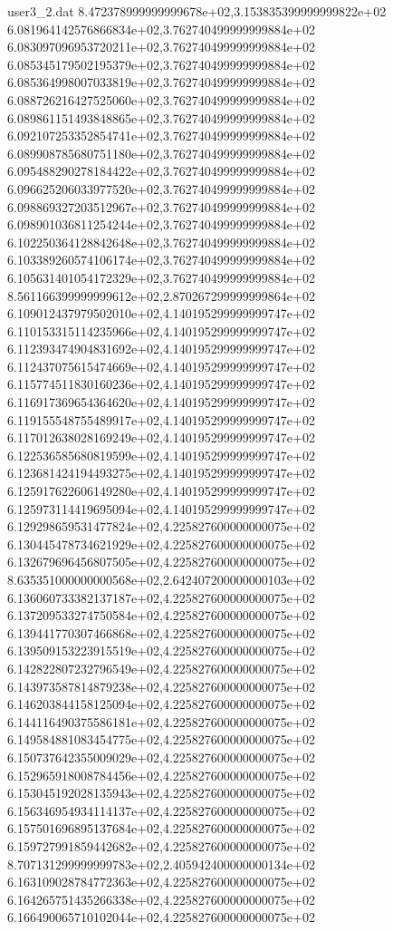 \begin{filecontents}{user3_2.dat}
8.472378999999999678e+02,3.153835399999999822e+02
6.081964142576866834e+02,3.762740499999999884e+02
6.083097096953720211e+02,3.762740499999999884e+02
6.085345179502195379e+02,3.762740499999999884e+02
6.085364998007033819e+02,3.762740499999999884e+02
6.088726216427525060e+02,3.762740499999999884e+02
6.089861151493848865e+02,3.762740499999999884e+02
6.092107253352854741e+02,3.762740499999999884e+02
6.089908785680751180e+02,3.762740499999999884e+02
6.095488290278184422e+02,3.762740499999999884e+02
6.096625206033977520e+02,3.762740499999999884e+02
6.098869327203512967e+02,3.762740499999999884e+02
6.098901036811254244e+02,3.762740499999999884e+02
6.102250364128842648e+02,3.762740499999999884e+02
6.103389260574106174e+02,3.762740499999999884e+02
6.105631401054172329e+02,3.762740499999999884e+02
8.561166399999999612e+02,2.870267299999999864e+02
6.109012437979502010e+02,4.140195299999999747e+02
6.110153315114235966e+02,4.140195299999999747e+02
6.112393474904831692e+02,4.140195299999999747e+02
6.112437075615474669e+02,4.140195299999999747e+02
6.115774511830160236e+02,4.140195299999999747e+02
6.116917369654364620e+02,4.140195299999999747e+02
6.119155548755489917e+02,4.140195299999999747e+02
6.117012638028169249e+02,4.140195299999999747e+02
6.122536585680819599e+02,4.140195299999999747e+02
6.123681424194493275e+02,4.140195299999999747e+02
6.125917622606149280e+02,4.140195299999999747e+02
6.125973114419695094e+02,4.140195299999999747e+02
6.129298659531477824e+02,4.225827600000000075e+02
6.130445478734621929e+02,4.225827600000000075e+02
6.132679696456807505e+02,4.225827600000000075e+02
8.635351000000000568e+02,2.642407200000000103e+02
6.136060733382137187e+02,4.225827600000000075e+02
6.137209533274750584e+02,4.225827600000000075e+02
6.139441770307466868e+02,4.225827600000000075e+02
6.139509153223915519e+02,4.225827600000000075e+02
6.142822807232796549e+02,4.225827600000000075e+02
6.143973587814879238e+02,4.225827600000000075e+02
6.146203844158125094e+02,4.225827600000000075e+02
6.144116490375586181e+02,4.225827600000000075e+02
6.149584881083454775e+02,4.225827600000000075e+02
6.150737642355009029e+02,4.225827600000000075e+02
6.152965918008784456e+02,4.225827600000000075e+02
6.153045192028135943e+02,4.225827600000000075e+02
6.156346954934114137e+02,4.225827600000000075e+02
6.157501696895137684e+02,4.225827600000000075e+02
6.159727991859442682e+02,4.225827600000000075e+02
8.707131299999999783e+02,2.405942400000000134e+02
6.163109028784772363e+02,4.225827600000000075e+02
6.164265751435266338e+02,4.225827600000000075e+02
6.166490065710102044e+02,4.225827600000000075e+02

\end{filecontents}
